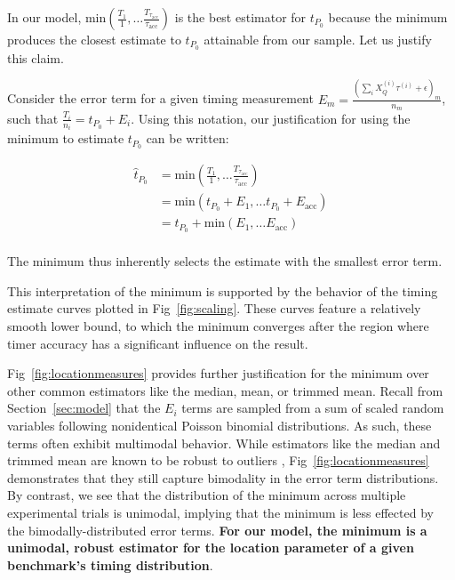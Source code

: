 \documentclass[conference]{IEEEtran}
\begin{document}
In our model, $\textrm{min}(\frac{T_1}{1}, \dots
\frac{T_{\tau_{\textrm{acc}}}}{\tau_{\textrm{acc}}})$ is the best estimator for $t_{P_0}$
because the minimum produces the closest estimate to $t_{P_0}$ attainable from our sample.
Let us justify this claim.

Consider the error term for a given timing measurement $E_m = \frac{\left(\sum_{i} X_Q^{(i)}
\tau^{(i)} + \epsilon \right)_m}{n_m}$, such that $\frac{T_i}{n_i} = t_{P_0} + E_i$. Using
this notation, our justification for using the minimum to estimate $t_{P_0}$ can be written:

\begin{align}
    \hat{t}_{P_0} &= \textrm{min}(\frac{T_1}{1}, \dots \frac{T_{\tau_{\textrm{acc}}}}{\tau_{\textrm{acc}}}) \\ \nonumber
                  &= \textrm{min}(t_{P_0} + E_1, \dots t_{P_0} + E_{\textrm{acc}}) \\ \nonumber
                  &= t_{P_0} + \textrm{min}(E_1, \dots E_{\textrm{acc}}) \\ \nonumber
\end{align}

The minimum thus inherently selects the estimate with the smallest error term.

This interpretation of the minimum is supported by the behavior of the timing estimate curves
plotted in Fig~\ref{fig:scaling}. These curves feature a relatively smooth lower
bound, to which the minimum converges after the region where timer accuracy has a
significant influence on the result. 

Fig~\ref{fig:locationmeasures} provides further justification for the minimum over other
common estimators like the median, mean, or trimmed mean. Recall from
Section~\ref{sec:model} that the $E_i$ terms are sampled from a sum of scaled random
variables following nonidentical Poisson binomial distributions. As such, these terms often
exhibit multimodal behavior. While estimators like the median and trimmed mean are known to
be robust to outliers , Fig~\ref{fig:locationmeasures} demonstrates that they
still capture bimodality in the error term distributions. By contrast, we see that the
distribution of the minimum across multiple experimental trials is unimodal, implying that
the minimum is less effected by the bimodally-distributed error terms. \textbf{For our
model, the minimum is a unimodal, robust estimator for the location parameter of a given
benchmark's timing distribution}.
\end{document}
